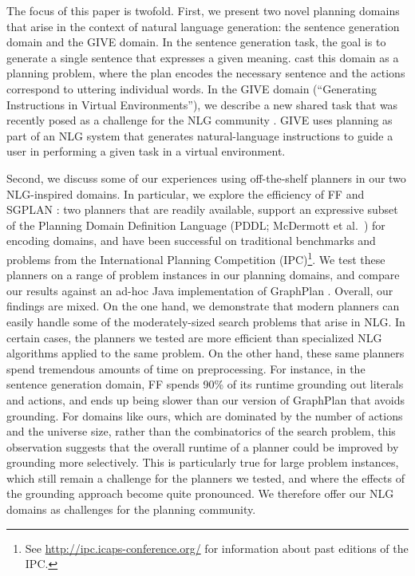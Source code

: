 \documentclass[letterpaper]{article}
\begin{document}
The focus of this paper is twofold. First, we present two novel planning
domains that arise in the context of natural language generation: the
sentence generation domain and the GIVE domain. In the sentence generation
task, the goal is to generate a single sentence that expresses a given
meaning. \citet{KolSto07} cast this domain as a planning problem, where the
plan encodes the necessary sentence and the actions correspond to uttering
individual words.  In the GIVE domain (``Generating Instructions in Virtual
Environments''), we describe a new shared task that was recently posed as a
challenge for the NLG community \citep{alexander07:_shared_task_propos}.
GIVE uses planning as part of an NLG system that generates natural-language
instructions to guide a user in performing a given task in a virtual
environment.

Second, we discuss some of our experiences using off-the-shelf
planners in our two NLG-inspired domains. In particular, we explore the
efficiency of FF \citep{HoffmannNebel01} and SGPLAN
\citep{hsu06:_new_featur_in_sgplan_for}: two planners that are readily
available, support an expressive subset of the Planning Domain Definition
Language (PDDL; McDermott et al.~\citeyear{PDDL}) for encoding domains, and
have been successful on traditional benchmarks and problems from the
International Planning Competition (IPC)\footnote{See
 \url{http://ipc.icaps-conference.org/} for information about past
 editions of the IPC.}.
We test these planners on a range of problem instances in our planning
domains, and compare our results against an ad-hoc Java implementation of
GraphPlan \citep{Blum1997}. Overall, our findings are mixed. On the one
hand, we demonstrate that modern planners can easily handle some of the
moderately-sized search problems that arise in NLG. In certain cases, the
planners we tested are more efficient than specialized NLG algorithms
applied to the same problem. On the other hand, these same planners spend
tremendous amounts of time on preprocessing. For instance, in the sentence
generation domain, FF spends 90\% of its runtime grounding out literals and
actions, and ends up being slower than our version of GraphPlan that avoids
grounding. For domains like ours, which are dominated by the number of
actions and the universe size, rather than the combinatorics of the search
problem, this observation suggests that the overall runtime of a planner
could be improved by grounding more selectively. This is particularly true
for large problem instances, which still remain a challenge for the
planners we tested, and where the effects of the grounding approach become
quite pronounced. We therefore offer our NLG domains as challenges for the
planning community.
\end{document}

